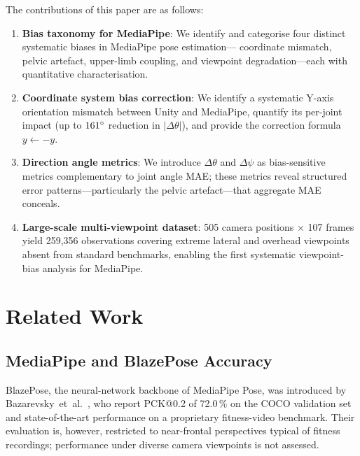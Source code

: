 \documentclass[twocolumn]{article}
\begin{document}
The contributions of this paper are as follows:
\begin{enumerate}\itemsep0pt
  \item \textbf{Bias taxonomy for MediaPipe}: We identify and categorise
        four distinct systematic biases in MediaPipe pose estimation---
        coordinate mismatch, pelvic artefact, upper-limb coupling, and
        viewpoint degradation---each with quantitative characterisation.
  \item \textbf{Coordinate system bias correction}: We identify a
        systematic Y-axis orientation mismatch between Unity and MediaPipe,
        quantify its per-joint impact (up to $161\degree{}$ reduction in
        $|\Delta\theta|$), and provide the correction formula
        $y \leftarrow -y$.
  \item \textbf{Direction angle metrics}: We introduce $\Delta\theta$ and
        $\Delta\psi$ as bias-sensitive metrics complementary to joint angle
        MAE; these metrics reveal structured error patterns---particularly
        the pelvic artefact---that aggregate MAE conceals.
  \item \textbf{Large-scale multi-viewpoint dataset}: 505 camera positions
        $\times$ 107 frames yield 259,356 observations covering extreme
        lateral and overhead viewpoints absent from standard benchmarks,
        enabling the first systematic viewpoint-bias analysis for MediaPipe.
\end{enumerate}

\section{Related Work}

\subsection{MediaPipe and BlazePose Accuracy}

BlazePose, the neural-network backbone of MediaPipe Pose, was introduced by
Bazarevsky~et~al.~\cite{blazepose}, who report PCK@0.2 of 72.0\,\% on the
COCO validation set and state-of-the-art performance on a proprietary
fitness-video benchmark. Their evaluation is, however, restricted to
near-frontal perspectives typical of fitness recordings; performance under
diverse camera viewpoints is not assessed.
\end{document}

